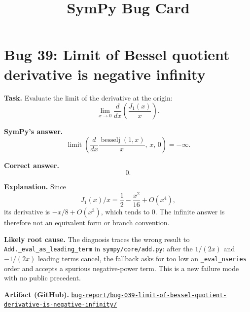 \documentclass[11pt]{article}
\title{SymPy Bug Card}
\author{}
\date{}
\newcommand{\artifactrepo}{https://github.com/TODO-org/TODO-repo}
\newcommand{\bugbundle}[1]{\href{\artifactrepo/tree/main/bug-report/#1}{\nolinkurl{bug-report/#1/}}}
\begin{document}
\maketitle

\section*{Bug 39: Limit of Bessel quotient derivative is negative infinity}

\begin{counterexamplebox}
\textbf{Task.} Evaluate the limit of the derivative at the origin:
\[
    \lim_{x\to 0}\frac{d}{dx}\left(\frac{J_1(x)}{x}\right).
\]

\medskip
\textbf{SymPy's answer.}
\[
    \operatorname{limit}\!\left(
      \frac{d}{dx}\frac{\operatorname{besselj}(1,x)}{x},\,x,\,0
    \right)=-\infty.
\]

\medskip
\textbf{Correct answer.}
\[
    0.
\]

\medskip
\textbf{Explanation.} Since
\[
    J_1(x)/x=\frac{1}{2}-\frac{x^2}{16}+O(x^4),
\]
its derivative is \(-x/8+O(x^3)\), which tends to \(0\). The infinite answer is
therefore not an equivalent form or branch convention.

\medskip
\textbf{Likely root cause.} The diagnosis traces the wrong result to
\texttt{Add.\_eval\_as\_leading\_term} in \nolinkurl{sympy/core/add.py}: after
the \(1/(2x)\) and \(-1/(2x)\) leading terms cancel, the fallback asks for too
low an \texttt{\_eval\_nseries} order and accepts a spurious negative-power
term. This is a new failure mode with no public precedent.

\medskip
\textbf{Artifact (GitHub).} \bugbundle{bug-039-limit-of-bessel-quotient-derivative-is-negative-infinity}
\end{counterexamplebox}
\end{document}
